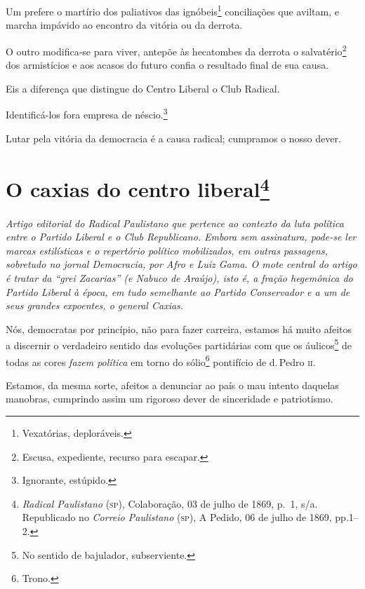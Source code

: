 Um prefere o martírio dos paliativos das ignóbeis\footnote{Vexatórias,
  deploráveis.} conciliações que aviltam, e marcha impávido ao encontro
da vitória ou da derrota.

O outro modifica-se para viver, antepõe às hecatombes da derrota o
salvatério\footnote{Escusa, expediente, recurso para escapar.} dos
armistícios e aos acasos do futuro confia o resultado final de sua
causa.

Eis a diferença que distingue do Centro Liberal o Club Radical.

Identificá-los fora empresa de néscio.\footnote{Ignorante, estúpido.}

Lutar pela vitória da democracia é a causa radical; cumpramos o nosso
dever.

\chapter{O caxias do centro liberal\footnote{\emph{Radical Paulistano}
  (\textsc{sp}), Colaboração, 03 de julho de 1869, p.~1, s/a. Republicado no \emph{Correio
  Paulistano} (\textsc{sp}), A Pedido, 06 de julho de 1869, pp.1--2.}}

\begin{didascalia}\itshape
Artigo editorial do \textnormal{Radical Paulistano} que pertence ao contexto
da luta política entre o Partido Liberal e o Club Republicano. Embora
sem assinatura, pode-se ler marcas estilísticas e o repertório político
mobilizados, em outras passagens, sobretudo no jornal \textnormal{Democracia},
por Afro e Luiz Gama. O mote central do artigo é tratar da ``grei
Zacarias'' (e Nabuco de Araújo), isto é, a fração hegemônica do Partido
Liberal à época, em tudo semelhante ao Partido Conservador e a um de
seus grandes expoentes, o general Caxias.
\end{didascalia}



Nós, democratas por princípio, não para fazer carreira, estamos há muito
afeitos a discernir o verdadeiro sentido das evoluções partidárias com
que os áulicos\footnote{No sentido de bajulador, subserviente.} de
todas as cores \emph{fazem política} em torno do sólio\footnote{Trono.}
pontifício de d.\,Pedro \textsc{ii}.

Estamos, da mesma sorte, afeitos a denunciar ao país o mau intento
daquelas manobras, cumprindo assim um rigoroso dever de sinceridade e
patriotismo.

